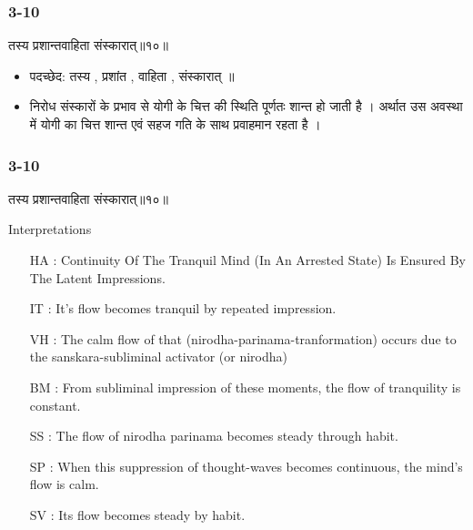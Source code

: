 \begin{frame}[fragile]\frametitle{3-10}
\begin{sanskrit}
तस्य प्रशान्तवाहिता संस्कारात्॥१०॥
\end{sanskrit}

\begin{itemize}
\item पदच्छेद: तस्य , प्रशांत‌ , वाहिता , संस्कारात् ‌॥
\item  निरोध संस्कारों के प्रभाव से योगी के चित्त की स्थिति पूर्णतः शान्त हो जाती है । अर्थात उस अवस्था में योगी का चित्त शान्त एवं सहज गति के साथ प्रवाहमान रहता है ।
\end{itemize}
\end{frame}

\begin{frame}[fragile]\frametitle{3-10}
\begin{sanskrit}
तस्य प्रशान्तवाहिता संस्कारात्॥१०॥
\end{sanskrit}

Interpretations
\begin{itemize}	
\item [HA]: Continuity Of The Tranquil Mind (In An Arrested State) Is Ensured By The Latent Impressions.
\item [IT]: It’s flow becomes tranquil by repeated impression.
\item [VH]: The calm flow of that (nirodha-parinama-tranformation) occurs due to the sanskara-subliminal activator (or nirodha)
\item [BM]: From subliminal impression of these moments, the flow of tranquility is constant.
\item [SS]: The flow of nirodha parinama becomes steady through habit.
\item [SP]: When this suppression of thought-waves becomes continuous, the mind’s flow is calm.
\item [SV]: Its flow becomes steady by habit. 
\end{itemize}
\end{frame}

